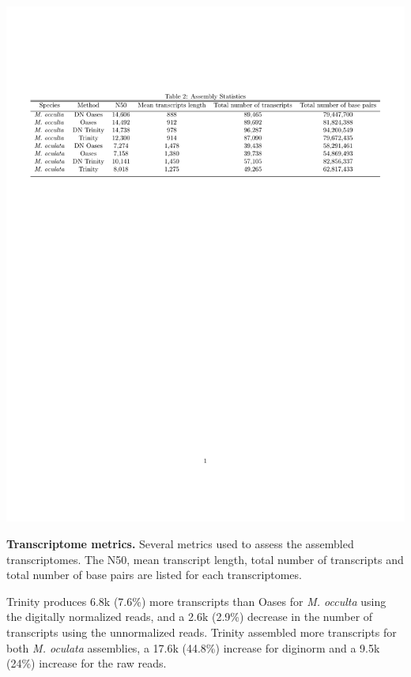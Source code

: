 \begin{table}[tbp]
\centering
\includegraphics[width=\linewidth]{manuscript/Table2.pdf}
\caption{\textbf{Transcriptome metrics.} Several metrics used to assess the assembled transcriptomes. The N50, mean transcript length, total number of transcripts and total number of base pairs are listed for each transcriptomes.}
\label{table:Table2.pdf}
\end{table}
   
Trinity produces 6.8k (7.6\%) more transcripts than Oases for \textit{M. occulta} using the digitally normalized reads, and a 2.6k (2.9\%) decrease in the number of transcripts using the unnormalized reads. Trinity assembled more transcripts for both \textit{M. oculata} assemblies, a 17.6k (44.8\%) increase for diginorm and a 9.5k (24\%) increase for the raw reads. 

